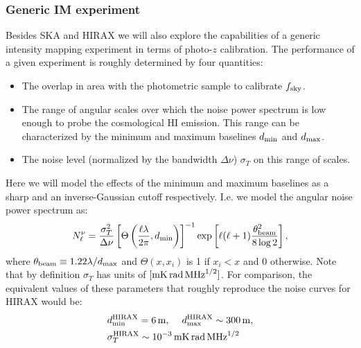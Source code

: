 \documentclass[prd,twocolumn]{revtex4}
\begin{document}
    \subsubsection{Generic IM experiment}\label{sssec:method.imap.generic}
      Besides SKA and HIRAX we will also explore the capabilities of a generic intensity mapping
      experiment in terms of photo-$z$ calibration. The performance of a given experiment is
      roughly determined by four quantities:
      \begin{itemize}
        \item The overlap in area with the photometric sample to calibrate $f_{\rm sky}$.
        \item The range of angular scales over which the noise power spectrum is low enough
              to probe the cosmological HI emission. This range can be characterized by the
              minimum and maximum baselines $d_{\rm min}$ and $d_{\rm max}$.
        \item The noise level (normalized by the bandwidth $\Delta\nu$) $\sigma_{T}$ on
              this range of scales.
      \end{itemize}
      Here we will model the effects of the minimum and maximum baselines as a sharp and an
      inverse-Gaussian cutoff respectively. I.e. we model the angular noise power spectrum as:
      \begin{equation}
        N^\nu_\ell=\frac{\sigma^2_{T}}{\Delta\nu}
        \left[\Theta\left(\frac{\ell\lambda}{2\pi},d_{\rm min}\right)\right]^{-1}
        \exp\left[\ell(\ell+1)\frac{\theta_{\rm beam}^2}{8\log2}\right],
      \end{equation}
      where $\theta_{\rm beam}\equiv1.22\lambda/d_{\rm max}$ and $\Theta(x,x_i)$ is 1 if
      $x_i<x$ and 0 otherwise. Note that by definition $\sigma_{T}$ has units of
      $[{\rm mK}\,{\rm rad}\,{\rm MHz}^{1/2}]$. For comparison, the equivalent
      values of these parameters that roughly reproduce the noise curves for HIRAX would be:
      \begin{align}\nonumber
        &d^{\rm HIRAX}_{\rm min}=6\,{\rm m},\hspace{12pt}d^{\rm HIRAX}_{\rm max}\sim300\,{\rm m},\\\nonumber
        &\sigma^{\rm HIRAX}_{T}\sim10^{-3}\,{\rm mK}\,{\rm rad}\,{\rm MHz}^{1/2}
      \end{align}
      
\end{document}
